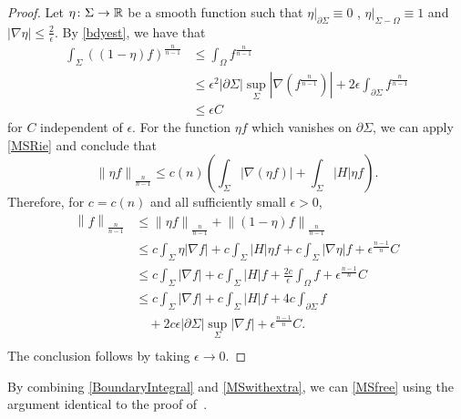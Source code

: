 \begin{proof}
    Let $\eta \colon \Sigma \to \mathbb{R}$ be a smooth function such that $\eta |_{\partial \Sigma } \equiv 0$ , $\eta |_{ \Sigma - \Omega } \equiv 1$ and $\left| \nabla \eta  \right| \leq \frac{2}{\epsilon }$. By \autoref{bdyest}, we have that 
    \begin{equation*}
    \begin{split}
        \int_{\Sigma} \left( \left( 1-\eta  \right) f \right) ^{\frac{n}{n-1}}
    &\leq \int_{\Omega }^{} f_{}^{\frac{n}{n-1}}   \\
    &\leq \epsilon ^2 \left| \partial \Sigma  \right| \sup _{\Sigma }\left| \nabla \left( f_{}^{\frac{n}{n-1}} \right)  \right| +2 \epsilon \int_{\partial \Sigma} f_{}^{\frac{n}{n-1}} \\
    &\leq \epsilon C
    \end{split}
    \end{equation*}
    for $C$ independent of $\epsilon $. For the function $\eta f$ which vanishes on $\partial \Sigma $, we can apply \autoref{MSRie} and conclude that 
    \[\left\| \eta  f \right\| _{\frac{n}{n-1}} \leq  c(n) \left( \int_{\Sigma} \left| \nabla (\eta f) \right| + \int_{\Sigma} \left| H  \right|\eta f  \right). \] 
    Therefore, for $c=c(n)$ and all sufficiently small $\epsilon >0$,
    \begin{equation*}
    \begin{split}
        \left\| f \right\| _{\frac{n}{n-1}} 
    &\leq \left\| \eta  f \right\| _{\frac{n}{n-1}}+\left\| (1-\eta )f \right\| _{\frac{n}{n-1}}  \\
    & \leq c \int_{\Sigma} \eta \left| \nabla f \right| +c \int_{\Sigma} \left| H \right| \eta f + c \int_{\Sigma} \left| \nabla \eta  \right| f + \epsilon ^{\frac{n-1}{n}}C\\
    &\leq c \int_{\Sigma}  \left| \nabla f \right| +c \int_{\Sigma} \left| H \right| f + \frac{2c}{\epsilon } \int_{\Omega }  f + \epsilon ^{\frac{n-1}{n}}C\\
    &\leq c \int_{\Sigma}  \left| \nabla f \right| +c \int_{\Sigma} \left| H \right| f +4c \int_{\partial \Sigma} f\\
    &\quad + 2c \epsilon  \left| \partial \Sigma  \right| \sup _{\Sigma }\left| \nabla f \right|+ \epsilon ^{\frac{n-1}{n}}C.\\
    \end{split}
    \end{equation*}
    The conclusion follows by taking $\epsilon \to 0$.
\end{proof}

By combining \autoref{BoundaryIntegral} and \autoref{MSwithextra}, we can \autoref{MSfree} using the argument identical to the proof of~\cite[Theorem 2.3]{edelen_convexity_2016}.



